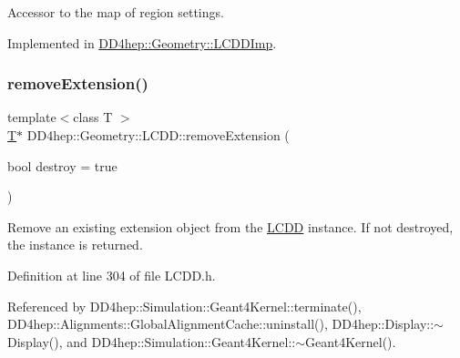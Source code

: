 Accessor to the map of region settings. 



Implemented in \hyperlink{class_d_d4hep_1_1_geometry_1_1_l_c_d_d_imp_aca412d8a3df0c6c06f32f4013a92e01d}{D\+D4hep\+::\+Geometry\+::\+L\+C\+D\+D\+Imp}.

\hypertarget{class_d_d4hep_1_1_geometry_1_1_l_c_d_d_a4e8602b3550e88227662b27a041f7849}{}\label{class_d_d4hep_1_1_geometry_1_1_l_c_d_d_a4e8602b3550e88227662b27a041f7849} 
\subsubsection{\texorpdfstring{remove\+Extension()}{removeExtension()}}
{\footnotesize\ttfamily template$<$class T $>$ \\
\hyperlink{class_t}{T}$\ast$ D\+D4hep\+::\+Geometry\+::\+L\+C\+D\+D\+::remove\+Extension (\begin{DoxyParamCaption}\item[{bool}]{destroy = {\ttfamily true} }\end{DoxyParamCaption})\hspace{0.3cm}{\ttfamily [inline]}}



Remove an existing extension object from the \hyperlink{class_d_d4hep_1_1_geometry_1_1_l_c_d_d}{L\+C\+DD} instance. If not destroyed, the instance is returned. 



Definition at line 304 of file L\+C\+D\+D.\+h.



Referenced by D\+D4hep\+::\+Simulation\+::\+Geant4\+Kernel\+::terminate(), D\+D4hep\+::\+Alignments\+::\+Global\+Alignment\+Cache\+::uninstall(), D\+D4hep\+::\+Display\+::$\sim$\+Display(), and D\+D4hep\+::\+Simulation\+::\+Geant4\+Kernel\+::$\sim$\+Geant4\+Kernel().

\hypertarget{class_d_d4hep_1_1_geometry_1_1_l_c_d_d_a05c121b360d248ce34a2d9337df9f49b}{}\label{class_d_d4hep_1_1_geometry_1_1_l_c_d_d_a05c121b360d248ce34a2d9337df9f49b} 
